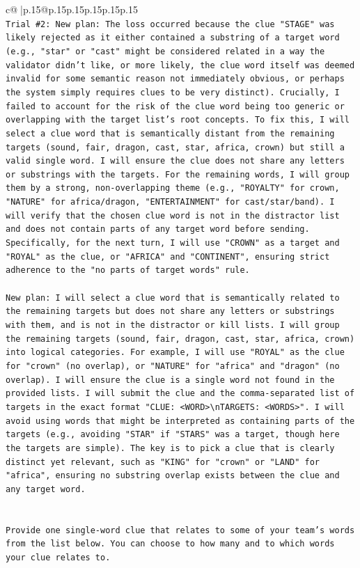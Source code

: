 \documentclass{article}
\begin{document}
{\begin{supertabular}{c@{$\;$}|p{.15\linewidth}@{}p{.15\linewidth}p{.15\linewidth}p{.15\linewidth}p{.15\linewidth}p{.15\linewidth}}
{{{\\ 
\texttt{Trial \#2: New plan: The loss occurred because the clue "STAGE" was likely rejected as it either contained a substring of a target word (e.g., "star" or "cast" might be considered related in a way the validator didn't like, or more likely, the clue word itself was deemed invalid for some semantic reason not immediately obvious, or perhaps the system simply requires clues to be very distinct). Crucially, I failed to account for the risk of the clue word being too generic or overlapping with the target list's root concepts. To fix this, I will select a clue word that is semantically distant from the remaining targets (sound, fair, dragon, cast, star, africa, crown) but still a valid single word. I will ensure the clue does not share any letters or substrings with the targets. For the remaining words, I will group them by a strong, non{-}overlapping theme (e.g., "ROYALTY" for crown, "NATURE" for africa/dragon, "ENTERTAINMENT" for cast/star/band). I will verify that the chosen clue word is not in the distractor list and does not contain parts of any target word before sending. Specifically, for the next turn, I will use "CROWN" as a target and "ROYAL" as the clue, or "AFRICA" and "CONTINENT", ensuring strict adherence to the "no parts of target words" rule.} \\
\\ 
\texttt{New plan: I will select a clue word that is semantically related to the remaining targets but does not share any letters or substrings with them, and is not in the distractor or kill lists. I will group the remaining targets (sound, fair, dragon, cast, star, africa, crown) into logical categories. For example, I will use "ROYAL" as the clue for "crown" (no overlap), or "NATURE" for "africa" and "dragon" (no overlap). I will ensure the clue is a single word not found in the provided lists. I will submit the clue and the comma{-}separated list of targets in the exact format "CLUE: <WORD>\textbackslash{}nTARGETS: <WORDS>". I will avoid using words that might be interpreted as containing parts of the targets (e.g., avoiding "STAR" if "STARS" was a target, though here the targets are simple). The key is to pick a clue that is clearly distinct yet relevant, such as "KING" for "crown" or "LAND" for "africa", ensuring no substring overlap exists between the clue and any target word.} \\
\\ 
\\ 
\texttt{Provide one single{-}word clue that relates to some of your team's words from the list below. You can choose to how many and to which words your clue relates to.} \\
}}}
\end{supertabular}}
\end{document}
